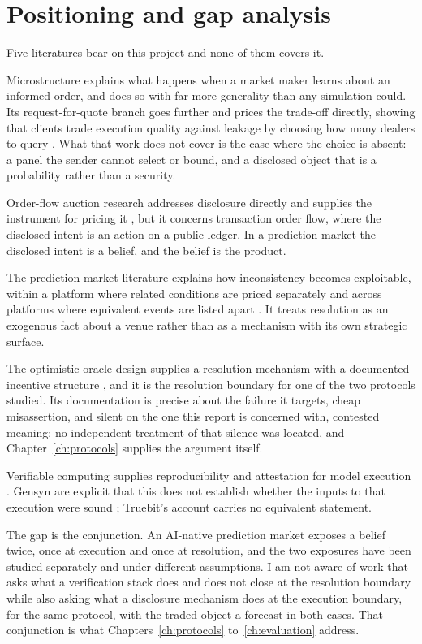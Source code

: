 \section{Positioning and gap analysis}
\label{sec:bg-gap}

Five literatures bear on this project and none of them covers it.

Microstructure explains what happens when a market maker learns about an informed order, and
does so with far more generality than any simulation could. Its request-for-quote branch
goes further and prices the trade-off directly, showing that clients trade execution quality
against leakage by choosing how many dealers to query \cite{hendershott2015click}. What that
work does not cover is the case where the choice is absent: a panel the sender cannot
select or bound, and a disclosed object that is a probability rather than a security.

Order-flow auction research addresses disclosure directly and supplies the instrument for
pricing it \cite{passeratpalmbach2025dphints}, but it concerns transaction order flow, where
the disclosed intent is an action on a public ledger. In a prediction market the disclosed
intent is a belief, and the belief is the product.

The prediction-market literature explains how inconsistency becomes exploitable, within a
platform where related conditions are priced separately \cite{saguillo2025forest} and across
platforms where equivalent events are listed apart \cite{gebele2026semantic}. It treats
resolution as an exogenous fact about a venue rather than as a mechanism with its own
strategic surface.

The optimistic-oracle design supplies a resolution mechanism with a documented incentive
structure \cite{uma2026oracle}, and it is the resolution boundary for one of the two
protocols studied. Its documentation is precise about the failure it targets, cheap
misassertion, and silent on the one this report is concerned with, contested meaning; no
independent treatment of that silence was located, and Chapter~\ref{ch:protocols} supplies
the argument itself.

Verifiable computing supplies reproducibility and attestation for model execution
\cite{gensyn2026receipts,truebit2026orchestration}. Gensyn are explicit that this does not
establish whether the inputs to that execution were sound \cite{gensyn2026receipts};
Truebit's account carries no equivalent statement.

The gap is the conjunction. An AI-native prediction market exposes a belief twice, once at
execution and once at resolution, and the two exposures have been studied separately and
under different assumptions. I am not aware of work that asks what a verification stack
does and does not close at the resolution boundary while also asking what a disclosure
mechanism does at the execution boundary, for the same protocol, with the traded object a
forecast in both cases. That conjunction is what Chapters~\ref{ch:protocols}
to~\ref{ch:evaluation} address.
